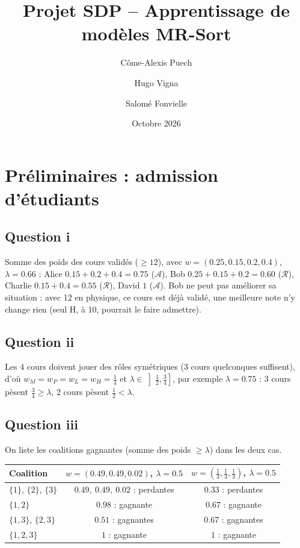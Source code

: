 \documentclass[10pt,a4paper]{article}
\title{Projet SDP -- Apprentissage de modèles MR-Sort}
\author{Côme-Alexis Puech \and Hugo Vigna \and Salomé Fonvielle}
\date{Octobre 2026}
\newcommand{\A}{\mathcal{A}}
\newcommand{\R}{\mathcal{R}}
\begin{document}
\maketitle

\section*{Préliminaires : admission d'étudiants}

\subsection*{Question i}

Somme des poids des cours validés ($\geq 12$), avec $w=(0.25,0.15,0.2,0.4)$, $\lambda=0.66$ :
Alice $0.15+0.2+0.4=0.75$ ($\A$), Bob $0.25+0.15+0.2=0.60$ ($\R$),
Charlie $0.15+0.4=0.55$ ($\R$), David $1$ ($\A$).
Bob ne peut pas améliorer sa situation : avec 12 en physique, ce cours est déjà validé,
une meilleure note n'y change rien (seul H, à 10, pourrait le faire admettre).

\subsection*{Question ii}

Les 4 cours doivent jouer des rôles symétriques (3 cours quelconques suffisent), d'où
$w_M=w_P=w_L=w_H=\frac14$ et $\lambda\in\left]\frac12,\frac34\right]$, par exemple $\lambda=0.75$ :
3 cours pèsent $\frac34\geq\lambda$, 2 cours pèsent $\frac12<\lambda$.

\subsection*{Question iii}

On liste les coalitions gagnantes (somme des poids $\geq \lambda$) dans les deux cas.

\begin{center}
\begin{tabular}{lcc}
\toprule
Coalition & $w = (0.49, 0.49, 0.02)$, $\lambda=0.5$ & $w = (\frac13,\frac13,\frac13)$, $\lambda=0.5$ \\
\midrule
$\{1\}$, $\{2\}$, $\{3\}$ & $0.49,\ 0.49,\ 0.02$ : perdantes & $0.33$ : perdantes \\
$\{1,2\}$ & $0.98$ : gagnante & $0.67$ : gagnante \\
$\{1,3\}$, $\{2,3\}$ & $0.51$ : gagnantes & $0.67$ : gagnantes \\
$\{1,2,3\}$ & $1$ : gagnante & $1$ : gagnante \\
\bottomrule
\end{tabular}
\end{center}
\end{document}
